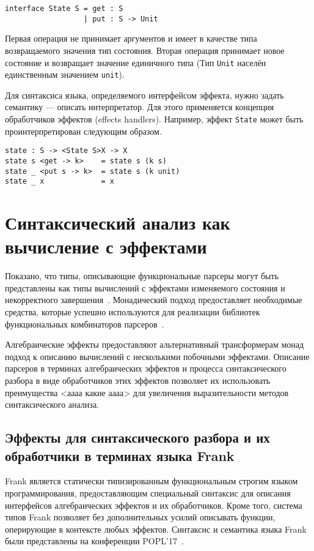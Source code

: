 \documentclass [a4paper] {article}
\begin{document}
\begin{verbatim}
interface State S = get : S
                  | put : S -> Unit
\end{verbatim}

Первая операция не принимает аргументов и имеет в качестве типа возвращаемого
значения тип состояния. Вторая операция принимает новое состояние и возвращает
значение единичного типа (Тип \texttt{Unit} населён единственным значением
\texttt{unit}).

Для синтаксиса языка, определяемого интерфейсом эффекта, нужно задать 
семантику --- описать интерпретатор. Для этого применяется концепция
обработчиков эффектов  (effects handlers). Например, эффект \texttt{State}
может быть проинтерпретирован следующим образом.

\begin{verbatim}
state : S -> <State S>X -> X
state s <get -> k>    = state s (k s)
state _ <put s -> k>  = state s (k unit)
state _ x             = x
\end{verbatim}

\section{Синтаксический анализ как вычисление с эффектами}

Показано, что типы, описывающие функциональные парсеры могут быть представлены
как типы вычислений с эффектами изменяемого состояния и некорректного
завершения~\cite{MonadicParsersCombinators}. Монадический подход предоставляет
необходимые средства, которые успешно используются для реализации библиотек
функциональных комбинаторов парсеров~\cite{Parsec}.

Алгебраические эффекты предоставляют альтернативный трансформерам монад подход к
описанию вычислений с несколькими побочными эффектами. Описание парсеров в
терминах алгебраических эффектов и процесса синтаксического разбора в виде
обработчиков этих эффектов позволяет их использовать преимущества
<аааа какие аааа> для увеличения выразительности методов синтаксического
анализа.

\subsection{Эффекты для синтаксического разбора и их обработчики  
            в терминах языка Frank}

Frank является статически типизированным функциональным
строгим языком программирования, предоставляющим специальный синтаксис для 
описания интерфейсов алгебраических эффектов и их обработчиков.
Кроме того, система типов Frank позволяет без дополнительных усилий описывать
функции, оперирующие в контексте любых эффектов. Синтаксис и семантика языка
Frank были представлены на конференции POPL'17~\cite{Frank-popl-2017}.
\end{document}
